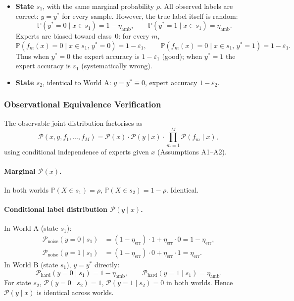 \begin{itemize}
  \item \textbf{State $s_1$}, with the same marginal probability $\rho$.
    All observed labels are correct: $y=y^*$ for every sample.  However, the
    true label itself is random:
    \[
    \mathbb{P}(y^*=0 \mid x\in s_1)=1-\eta_{\text{amb}},\qquad
    \mathbb{P}(y^*=1 \mid x\in s_1)=\eta_{\text{amb}}.
    \]
    Experts are biased toward class~0: for every $m$,
    \[
    \mathbb{P}(f_m(x)=0 \mid x\in s_1,\,y^*=0)=1-\varepsilon_1,\qquad
    \mathbb{P}(f_m(x)=0 \mid x\in s_1,\,y^*=1)=1-\varepsilon_1.
    \]
    Thus when $y^*=0$ the expert accuracy is $1-\varepsilon_1$ (good); when
    $y^*=1$ the expert accuracy is $\varepsilon_1$ (systematically wrong).
  \item \textbf{State $s_2$}, identical to World A: $y=y^*\equiv0$, expert
    accuracy $1-\varepsilon_2$.
\end{itemize}

\subsubsection{Observational Equivalence Verification}
\label{sec:thm3_verification}

The observable joint distribution factorises as
\[
\mathcal{P}(x,y,f_1,\dots,f_M)
= \mathcal{P}(x)\cdot\mathcal{P}(y\mid x)\cdot\prod_{m=1}^M\mathcal{P}(f_m\mid x),
\]
using conditional independence of experts given $x$ (Assumptions A1--A2).

\paragraph{Marginal $\mathcal{P}(x)$.}
In both worlds $\mathbb{P}(X\in s_1)=\rho$,
$\mathbb{P}(X\in s_2)=1-\rho$.  Identical.

\paragraph{Conditional label distribution $\mathcal{P}(y\mid x)$.}
In World A (state $s_1$):
\[
\begin{aligned}
\mathcal{P}_{\text{noise}}(y=0\mid s_1)
&= (1-\eta_{\text{err}})\cdot1 + \eta_{\text{err}}\cdot0 = 1-\eta_{\text{err}},\\
\mathcal{P}_{\text{noise}}(y=1\mid s_1)
&= (1-\eta_{\text{err}})\cdot0 + \eta_{\text{err}}\cdot1 = \eta_{\text{err}}.
\end{aligned}
\]
In World B (state $s_1$), $y=y^*$ directly:
\[
\mathcal{P}_{\text{hard}}(y=0\mid s_1)=1-\eta_{\text{amb}},\qquad
\mathcal{P}_{\text{hard}}(y=1\mid s_1)=\eta_{\text{amb}}.
\]
For state $s_2$, $\mathcal{P}(y=0\mid s_2)=1$,
$\mathcal{P}(y=1\mid s_2)=0$ in both worlds.  Hence
$\mathcal{P}(y\mid x)$ is identical across worlds.

